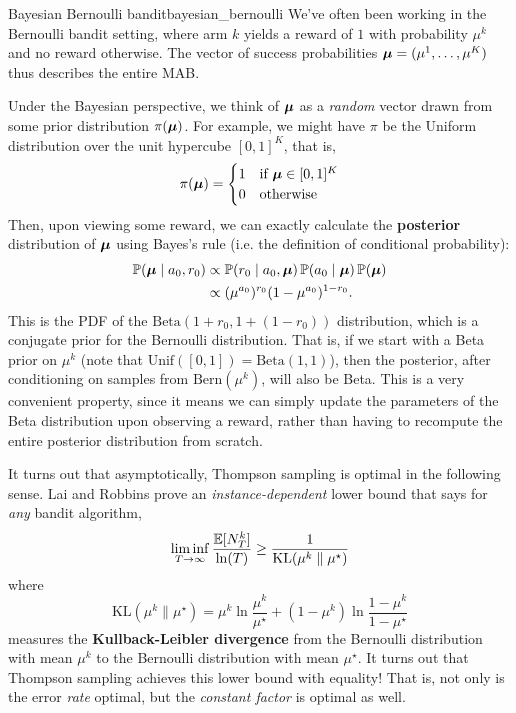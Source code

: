 \documentclass[\main/main]{subfiles}
\begin{document}
\begin{example}{Bayesian Bernoulli bandit}{bayesian_bernoulli}
    We've often been working in the Bernoulli bandit setting, where arm $k$ yields a reward of $1$ with probability $\mu^k$ and no reward otherwise. The vector of success probabilities $\boldsymbol{\mu} = (\mu^1, \dots, \mu^K)$ thus describes the entire MAB.

    Under the Bayesian perspective, we think of $\boldsymbol{\mu}$ as a \emph{random} vector drawn from some prior distribution $\pi(\boldsymbol{\mu})$. For example, we might have $\pi$ be the Uniform distribution over the unit hypercube $[0, 1]^K$, that is, \[
        \pi(\boldsymbol{\mu}) = \begin{cases}
            1 & \text{if } \boldsymbol{\mu} \in [0, 1]^K \\
            0 & \text{otherwise}
        \end{cases}
    \]
    Then, upon viewing some reward, we can exactly calculate the \textbf{posterior} distribution of $\boldsymbol{\mu}$ using Bayes's rule (i.e. the definition of conditional probability):
    \begin{align*}
        \operatorname*{\mathbb{P}}(\boldsymbol{\mu} \mid a_0, r_0) & \propto \operatorname*{\mathbb{P}}(r_0 \mid a_0, \boldsymbol{\mu}) \operatorname*{\mathbb{P}}(a_0 \mid \boldsymbol{\mu}) \operatorname*{\mathbb{P}}(\boldsymbol{\mu}) \\
                               & \propto (\mu^{a_0})^{r_0} (1 - \mu^{a_0})^{1-r_0}.
    \end{align*}
    This is the PDF of the $\text{Beta}(1 + r_0, 1 + (1 - r_0))$ distribution, which is a conjugate prior for the Bernoulli distribution. That is, if we start with a Beta prior on $\mu^k$ (note that $\text{Unif}([0, 1]) = \text{Beta}(1, 1)$), then the posterior, after conditioning on samples from $\text{Bern}(\mu^k)$, will also be Beta. This is a very convenient property, since it means we can simply update the parameters of the Beta distribution upon observing a reward, rather than having to recompute the entire posterior distribution from scratch.
\end{example}


It turns out that asymptotically, Thompson sampling is optimal in the following sense. Lai and Robbins \cite{lai_asymptotically_1985} prove an \emph{instance-dependent} lower bound that says for \emph{any} bandit algorithm,
\[
    \liminf_{T \to \infty} \frac{\operatorname*{\mathbb{E}}[N_T^k]}{\ln(T)} \ge \frac{1}{\text{KL}(\mu^k \parallel \mu^\star)}
\]
where \[
    \text{KL}(\mu^k \parallel \mu^\star) = \mu^k \ln \frac{\mu^k}{\mu^\star} + (1 - \mu^k) \ln \frac{1 - \mu^k}{1 - \mu^\star}
\] measures the \textbf{Kullback-Leibler divergence} from the Bernoulli distribution with mean $\mu^k$ to the Bernoulli distribution with mean $\mu^\star$.
It turns out that Thompson sampling achieves this lower bound with equality! That is, not only is the error \emph{rate} optimal, but the \emph{constant factor} is optimal as well.
\end{document}
